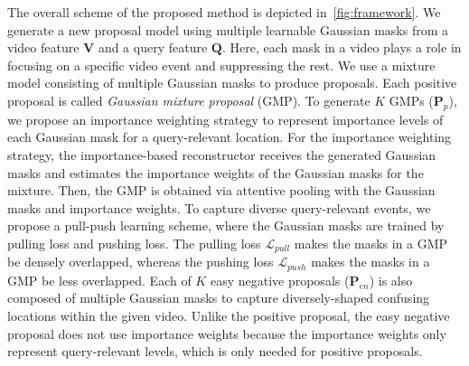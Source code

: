 
The overall scheme of the proposed method is depicted  in~\cref{fig:framework}.
We generate a new proposal model using multiple learnable Gaussian masks from a video feature $\mathbf{V}$ and a query feature $\mathbf{Q}$.
Here, each mask in a video plays a role in focusing on a specific video event and suppressing the rest.
We use a mixture model consisting of multiple Gaussian masks to produce proposals.
Each positive proposal is called {\it Gaussian mixture proposal} (GMP). %
To generate $K$ GMPs ($\mathbf{P}_{p}$), we propose an importance weighting strategy to represent importance levels of each Gaussian mask for a query-relevant location.
For the importance weighting strategy, the importance-based reconstructor receives the generated Gaussian masks and estimates the importance weights of the Gaussian masks for the mixture.
Then, the GMP is obtained via attentive pooling with the Gaussian masks and importance weights.
To capture diverse query-relevant events, we propose a pull-push learning scheme, where the Gaussian masks are trained by pulling loss and pushing loss. 
The pulling loss $\mathcal{L}_{pull}$ makes the masks in a GMP be densely overlapped, whereas  %
the pushing loss $\mathcal{L}_{push}$ makes the masks in a GMP be less overlapped.
Each of $K$ easy negative proposals ($\mathbf{P}_{en}$) is also composed of multiple Gaussian masks to capture diversely-shaped confusing locations within the given video. 
Unlike the positive proposal, the easy negative proposal does not use importance weights because the importance weights only represent query-relevant levels, which is only needed for positive proposals.
